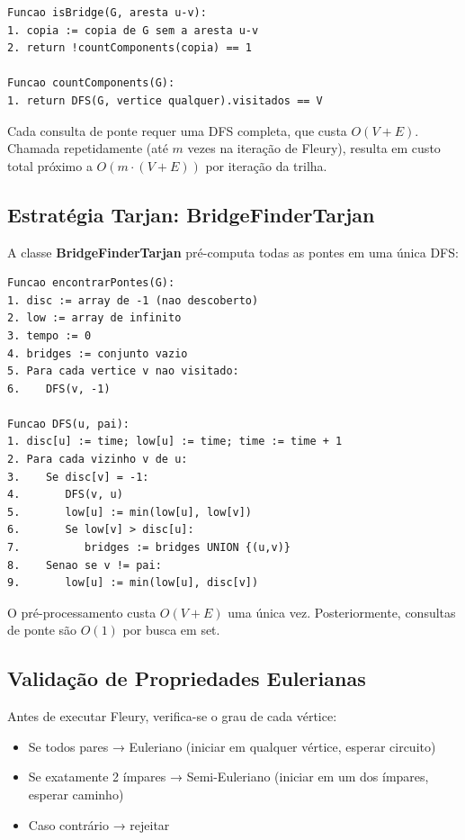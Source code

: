 \documentclass{sbc2023}%
\begin{document}
\begin{verbatim}
Funcao isBridge(G, aresta u-v):
1. copia := copia de G sem a aresta u-v
2. return !countComponents(copia) == 1

Funcao countComponents(G):
1. return DFS(G, vertice qualquer).visitados == V
\end{verbatim}

Cada consulta de ponte requer uma DFS completa, que custa $O(V + E)$. Chamada repetidamente (até $m$ vezes na iteração de Fleury), resulta em custo total próximo a $O(m \cdot (V + E))$ por iteração da trilha.

\subsection{Estratégia Tarjan: BridgeFinderTarjan}

A classe \textbf{BridgeFinderTarjan} pré-computa todas as pontes em uma única DFS:

\begin{verbatim}
Funcao encontrarPontes(G):
1. disc := array de -1 (nao descoberto)
2. low := array de infinito
3. tempo := 0
4. bridges := conjunto vazio
5. Para cada vertice v nao visitado:
6.    DFS(v, -1)

Funcao DFS(u, pai):
1. disc[u] := time; low[u] := time; time := time + 1
2. Para cada vizinho v de u:
3.    Se disc[v] = -1:
4.       DFS(v, u)
5.       low[u] := min(low[u], low[v])
6.       Se low[v] > disc[u]:
7.          bridges := bridges UNION {(u,v)}
8.    Senao se v != pai:
9.       low[u] := min(low[u], disc[v])
\end{verbatim}

O pré-processamento custa $O(V + E)$ uma única vez. Posteriormente, consultas de ponte são $O(1)$ por busca em set.

\subsection{Validação de Propriedades Eulerianas}

Antes de executar Fleury, verifica-se o grau de cada vértice:
\begin{itemize}
    \item Se todos pares → Euleriano (iniciar em qualquer vértice, esperar circuito)
    \item Se exatamente 2 ímpares → Semi-Euleriano (iniciar em um dos ímpares, esperar caminho)
    \item Caso contrário → rejeitar
\end{itemize}
\end{document}
